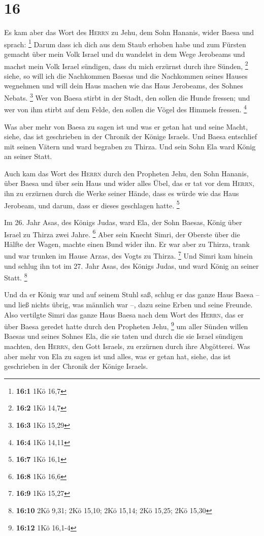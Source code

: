 \hypertarget{section-5}{%
\section{16}\label{section-5}}

 Es kam aber das Wort des \textsc{Herrn} zu Jehu, dem Sohn
Hananis, wider Baesa und sprach: \footnote{\textbf{16:1} 1Kö 16,7}
 Darum dass ich dich aus dem Staub erhoben habe und zum
Fürsten gemacht über mein Volk Israel und du wandelst in dem Wege
Jerobeams und machst mein Volk Israel sündigen, dass du mich erzürnst
durch ihre Sünden, \footnote{\textbf{16:2} 1Kö 14,7} 
siehe, so will ich die Nachkommen Baesas und die Nachkommen seines
Hauses wegnehmen und will dein Haus machen wie das Haus Jerobeams, des
Sohnes Nebats. \footnote{\textbf{16:3} 1Kö 15,29}  Wer von
Baesa stirbt in der Stadt, den sollen die Hunde fressen; und wer von ihm
stirbt auf dem Felde, den sollen die Vögel des Himmels fressen.
\footnote{\textbf{16:4} 1Kö 14,11}

 Was aber mehr von Baesa zu sagen ist und was er getan hat
und seine Macht, siehe, das ist geschrieben in der Chronik der Könige
Israels.  Und Baesa entschlief mit seinen Vätern und ward
begraben zu Thirza. Und sein Sohn Ela ward König an seiner Statt.

 Auch kam das Wort des \textsc{Herrn} durch den Propheten
Jehu, den Sohn Hananis, über Baesa und über sein Haus und wider alles
Übel, das er tat vor dem \textsc{Herrn}, ihn zu erzürnen durch die Werke
seiner Hände, dass es würde wie das Haus Jerobeam, und darum, dass er
dieses geschlagen hatte. \footnote{\textbf{16:7} 1Kö 16,1}

 Im 26. Jahr Asas, des Königs Judas, ward Ela, der Sohn
Baesas, König über Israel zu Thirza zwei Jahre. \footnote{\textbf{16:8}
  1Kö 16,6}  Aber sein Knecht Simri, der Oberste über die
Hälfte der Wagen, machte einen Bund wider ihn. Er war aber zu Thirza,
trank und war trunken im Hause Arzas, des Vogts zu Thirza. \footnote{\textbf{16:9}
  1Kö 15,27}  Und Simri kam hinein und schlug ihn tot im
27. Jahr Asas, des Königs Judas, und ward König an seiner Statt.
\footnote{\textbf{16:10} 2Kö 9,31; 2Kö 15,10; 2Kö 15,14; 2Kö 15,25; 2Kö
  15,30}

 Und da er König war und auf seinem Stuhl saß, schlug er
das ganze Haus Baesa -- und ließ nichts übrig, was männlich war --, dazu
seine Erben und seine Freunde.  Also vertilgte Simri das
ganze Haus Baesa nach dem Wort des \textsc{Herrn}, das er über Baesa
geredet hatte durch den Propheten Jehu, \footnote{\textbf{16:12} 1Kö
  16,1-4}  um aller Sünden willen Baesas und seines
Sohnes Ela, die sie taten und durch die sie Israel sündigen machten, den
\textsc{Herrn}, den Gott Israels, zu erzürnen durch ihre Abgötterei.
 Was aber mehr von Ela zu sagen ist und alles, was er
getan hat, siehe, das ist geschrieben in der Chronik der Könige Israels.

